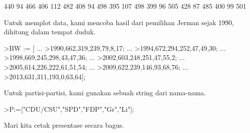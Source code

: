 \documentclass[a4paper,10pt]{article}
\begin{document}
\begin{eulernotebook}
\begin{euleroutput}
            440            94           466 
            406           112           482 
            408            94           498 
            395           107           498 
            399            96           505 
            428            87           485 
            400            99           501 
\end{euleroutput}
\begin{eulercomment}
Untuk memplot data, kami mencoba hasil dari pemilihan Jerman sejak 1990, dihitung dalam
tempat duduk.
\end{eulercomment}
\begin{eulerprompt}
>BW := [ ...
>1990,662,319,239,79,8,17; ...
>1994,672,294,252,47,49,30; ...
>1998,669,245,298,43,47,36; ...
>2002,603,248,251,47,55,2; ...
>2005,614,226,222,61,51,54; ...
>2009,622,239,146,93,68,76; ...
>2013,631,311,193,0,63,64];
\end{eulerprompt}
\begin{eulercomment}
Untuk partisi-partisi, kami gunakan sebuah string dari nama-nama.
\end{eulercomment}
\begin{eulerprompt}
>P:=["CDU/CSU","SPD","FDP","Gr","Li"];
\end{eulerprompt}
\begin{eulercomment}
Mari kita cetak presentase secara bagus.


\end{eulercomment}
\end{eulernotebook}
\end{document}
